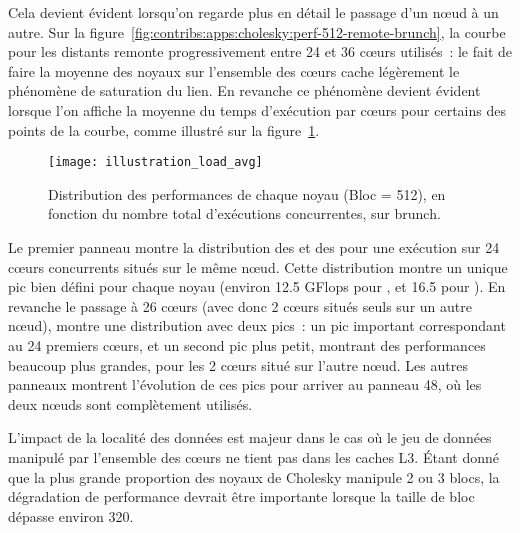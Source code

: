 Cela devient évident lorsqu'on regarde plus en détail le passage d'un nœud à un autre.
Sur la figure~\ref{fig:contribs:apps:cholesky:perf-512-remote-brunch}, la courbe pour les \gemm distants remonte progressivement entre 24 et 36 cœurs utilisés~: le fait de faire la moyenne des noyaux sur l'ensemble des cœurs cache légèrement le phénomène de saturation du lien.
En revanche ce phénomène devient évident lorsque l'on affiche la moyenne du temps d'exécution par cœurs pour certains des points de la courbe, comme illustré sur la figure~\ref{fig:contribs:apps:cholesky:distrib-load-512}.

\begin{figure}[ht]
  \centering
  \texttt{[image: illustration\_load\_avg]}
  \caption{Distribution des performances de chaque noyau (Bloc = 512), en fonction du nombre total d'exécutions concurrentes, sur brunch.}\label{fig:contribs:apps:cholesky:distrib-load-512}
\end{figure}

Le premier panneau montre la distribution des \gemm et des \potrf pour une exécution sur 24 cœurs concurrents situés sur le même nœud.
Cette distribution montre un unique pic bien défini pour chaque noyau (environ 12.5 GFlops pour \potrf, et 16.5 pour \gemm).
En revanche le passage à 26 cœurs (avec donc 2 cœurs situés seuls sur un autre nœud), montre une distribution avec deux pics~: un pic important correspondant au 24 premiers cœurs, et un second pic plus petit, montrant des performances beaucoup plus grandes, pour les 2 cœurs situé sur l'autre nœud.
Les autres panneaux montrent l'évolution de ces pics pour arriver au panneau 48, où les deux nœuds sont complètement utilisés.



L'impact de la localité des données est majeur dans le cas où le jeu de données manipulé par l'ensemble des cœurs ne tient pas dans les caches L3.
Étant donné que la plus grande proportion des noyaux de Cholesky manipule 2 ou 3 blocs, la dégradation de performance devrait être importante lorsque la taille de bloc dépasse environ 320.

